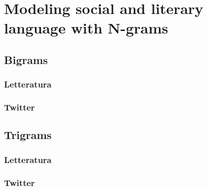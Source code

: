 \chapter{Modeling social and literary language with N-grams}

\section{Bigrams}

\subsection{Letteratura}

\subsection{Twitter}

\section{Trigrams}

\subsection{Letteratura}

\subsection{Twitter}

